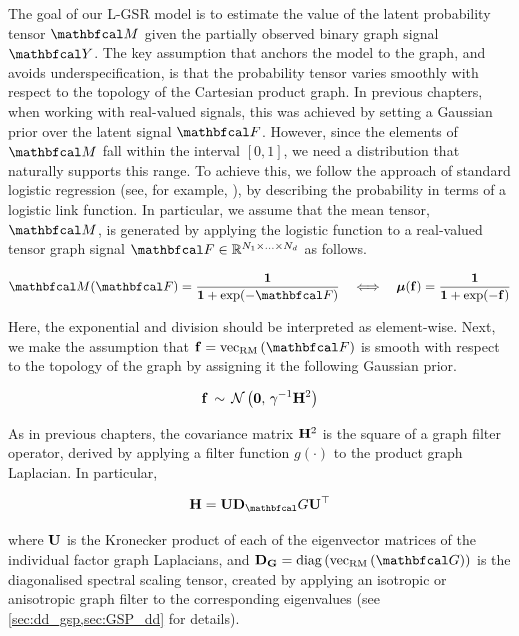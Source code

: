 The goal of our L-GSR model is to estimate the value of the latent probability tensor $\Mt$ given the partially observed binary graph signal $\Yt$. The key assumption that anchors the model to the graph, and avoids underspecification, is that the probability tensor varies smoothly with respect to the topology of the Cartesian product graph. In previous chapters, when working with real-valued signals, this was achieved by setting a Gaussian prior over the latent signal $\Ft$. However, since the elements of $\Mt$ fall within the interval $[0, 1]$, we need a distribution that naturally supports this range. To achieve this, we follow the approach of standard logistic regression (see, for example, \cite{Murphy2012}), by describing the probability in terms of a logistic link function. In particular, we assume that the mean tensor, $\Mt$, is generated by applying the logistic function to a real-valued tensor graph signal $\Ft \in \R^{N_1 \times ... \times N_d}$ as follows. 

\begin{equation}
    \label{eq:logistic_link}
    \Mt(\Ft) = \frac{\one}{\one + \exp(-\Ft)} \quad \Longleftrightarrow \quad \muu(\f) = \frac{\one}{\one + \exp(-\f)}
\end{equation}

Here, the exponential and division should be interpreted as element-wise. Next, we make the assumption that $\f = \vecrm{\Ft}$ is smooth with respect to the topology of the graph by assigning it the following Gaussian prior. 

\begin{equation}
    \label{eq:f_prior_logit}
    \mathbf{f}  \, \sim \, \mathcal{N}\left( \mathbf{0}, \, \gamma^{-1} \mathbf{H}^2 \right) 
\end{equation}

As in previous chapters, the covariance matrix $\mathbf{H}^2$ is the square of a graph filter operator, derived by applying a filter function $g(\cdot)$ to the product graph Laplacian. In particular, 

\begin{equation*}
    \HH = \U \D_\Gt \U^\top
\end{equation*}

where $\mathbf{U}$ is the Kronecker product of each of the eigenvector matrices of the individual factor graph Laplacians, and $\D_\G = \diag{\vecrm{\Gt}}$ is the diagonalised spectral scaling tensor, created by applying an isotropic or anisotropic graph filter to the corresponding eigenvalues (see \cref{sec:dd_gsp,sec:GSP_dd} for details). 

